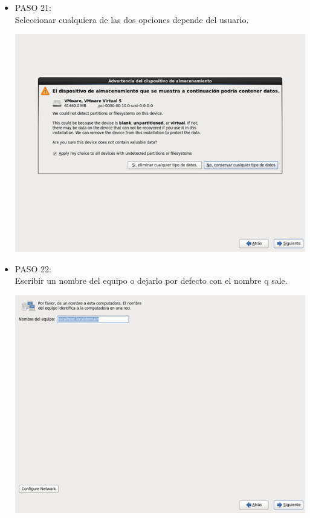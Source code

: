 \begin{itemize}
\item PASO 21:
\\Seleccionar  cualquiera de las dos opciones depende del usuario.
		\begin{center}
		\includegraphics[width=13cm]{./Imagenes/21}
		\end{center}
	
	\end{itemize} 

\begin{itemize}
\item PASO 22:
\\Escribir un nombre del equipo o dejarlo por defecto con el nombre q sale.
		\begin{center}
		\includegraphics[width=13cm]{./Imagenes/22}
		\end{center}
	\\\
	\end{itemize} 

